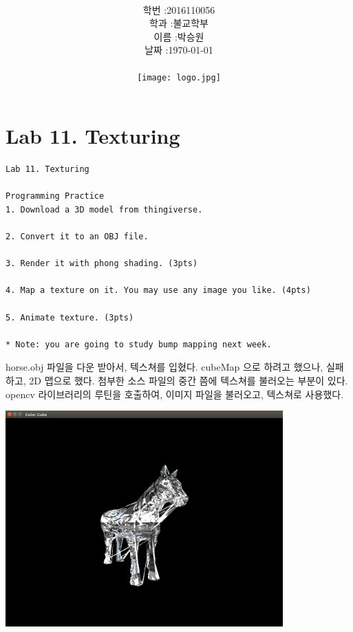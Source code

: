 \documentclass[12pt,a4paper]{article}
\title{
	\centering
	\pgfornament[width=12cm,color=teal]{84}\\
	\vspace{1cm}
	\fontsize{50}{50} \selectfont {컴퓨터 그래픽스 입문}\\
		\pgfornament[width=12cm,color=teal]{88}\\
	\vfill}
\author{
	\LARGE
	\begin{tabular}{rl}
		\hline
		학번 : & 2016110056\\ 
		학과 : & 불교학부 \\
		이름 : & 박승원\\
		날짜 : & \today\\
		\hline
	\end{tabular}\vspace{2cm}
	\\
\texttt{[image: logo.jpg]}
	}
\date{}
\begin{document}
\maketitle
{}
\noindent
\lstset{language=C++, columns=flexible, tabsize=4, frame=shadowbox, showstringspaces=false, breaklines=true, upquote=true, basicstyle=\normalsize}
\newpage
\section*{Lab 11. Texturing}
	
\begin{verbatim}
Lab 11. Texturing

Programming Practice
1. Download a 3D model from thingiverse.

2. Convert it to an OBJ file.

3. Render it with phong shading. (3pts) 

4. Map a texture on it. You may use any image you like. (4pts) 

5. Animate texture. (3pts)

* Note: you are going to study bump mapping next week.

\end{verbatim}

horse.obj 파일을 다운 받아서, 텍스쳐를 입혔다.
cubeMap 으로 하려고 했으나, 실패하고, 2D 맵으로 했다.
첨부한 소스 파일의 중간 쯤에 텍스쳐를 불러오는 부분이 있다.
opencv 라이브러리의 루틴을 호출하여, 이미지 파일을 불러오고, 텍스쳐로 사용했다.

\includegraphics[width=0.8\textwidth]{1.png}



\end{document}
